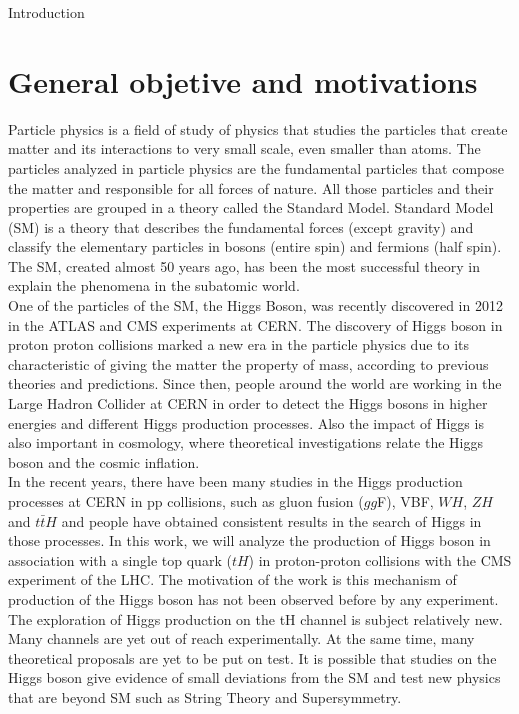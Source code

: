 \renewcommand{\baselinestretch}{1.5}
\begin{chapter}{Introduction}

\section{General objetive and motivations}

Particle physics is a field of study of physics that studies the particles that create matter and its interactions to very small scale, even smaller than atoms. The particles analyzed in particle physics are the fundamental particles that compose the matter and responsible for all forces of nature. All those particles  and their properties are grouped in a theory called the Standard Model. Standard Model (SM) is a theory that describes the fundamental forces (except gravity) and classify the elementary particles in bosons (entire spin) and fermions (half spin).
The SM, created almost 50 years ago, has been the most successful theory in explain the phenomena in the subatomic world.
\\

One of the particles of the SM, the Higgs Boson, was recently discovered in 2012 in the ATLAS and CMS experiments at CERN. The discovery of Higgs boson in  proton proton collisions marked a new era in the particle physics due to its characteristic of giving the matter the property of mass, according to previous theories and predictions. Since then, people around the world are working in the Large Hadron Collider at CERN in order to detect the Higgs bosons in higher energies and different Higgs production processes. 
Also the impact of Higgs is also important in cosmology,  where theoretical investigations relate the Higgs boson and the cosmic inflation.\\

In the recent years, there have been many studies in the Higgs production processes at CERN in pp collisions, such as gluon fusion ($gg$F), VBF, $WH$, $ZH$ and $t\bar{t}H$ and people have obtained consistent results in the search of Higgs in those processes. In this work, we will analyze the production of Higgs boson in association with a
single top quark ($tH$) in proton-proton collisions with the CMS experiment of the LHC. The motivation of the work is this mechanism of production of the Higgs boson has not been observed before by any experiment. The exploration of Higgs production on the tH channel is subject relatively new. Many channels are yet out of reach experimentally. At the same time, many theoretical
proposals are yet to be put on test. It is possible that studies on the Higgs boson give evidence of small deviations from the SM  and test new physics that are beyond SM such as String Theory and Supersymmetry. \\



\end{chapter}
